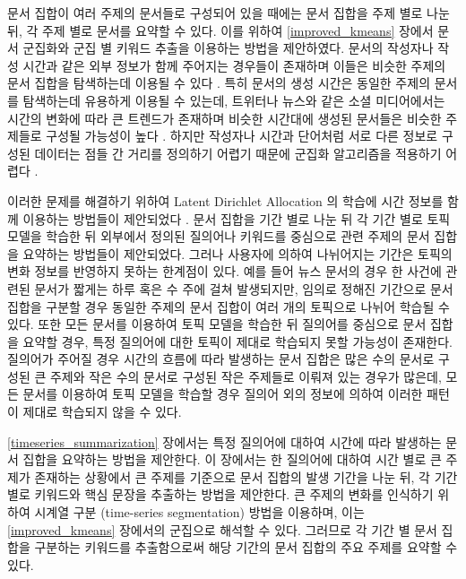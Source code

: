 \documentclass[oneside, ko,phd]{snuthesis_utf8_kor}
\begin{document}
문서 집합이 여러 주제의 문서들로 구성되어 있을 때에는 문서 집합을 주제 별로 나눈 뒤, 각 주제 별로 문서를 요약할 수 있다.
이를 위하여 \ref{improved_kmeans} 장에서 문서 군집화와 군집 별 키워드 추출을 이용하는 방법을 제안하였다.
문서의 작성자나 작성 시간과 같은 외부 정보가 함께 주어지는 경우들이 존재하며 이들은 비슷한 주제의 문서 집합을 탐색하는데 이용될 수 있다 \cite{liu2009topic, balasubramanyan2011block}.
특히 문서의 생성 시간은 동일한 주제의 문서를 탐색하는데 유용하게 이용될 수 있는데, 트위터나 뉴스와 같은 소셜 미디어에서는 시간의 변화에 따라 큰 트렌드가 존재하며 \cite{diao2012finding} 비슷한 시간대에 생성된 문서들은 비슷한 주제들로 구성될 가능성이 높다 \cite{blei2006dynamic, alsumait2008line}.
하지만 작성자나 시간과 단어처럼 서로 다른 정보로 구성된 데이터는 점들 간 거리를 정의하기 어렵기 때문에 군집화 알고리즘을 적용하기 어렵다 \cite{hennig2013find, browne2012model}.

이러한 문제를 해결하기 위하여 Latent Dirichlet Allocation \cite{blei2003latent} 의 학습에 시간 정보를 함께 이용하는 방법들이 제안되었다 \cite{blei2006dynamic, wang2006topics, huang2017probabilistic}.
문서 집합을 기간 별로 나눈 뒤 각 기간 별로 토픽 모델을 학습한 뒤 외부에서 정의된 질의어나 키워드를 중심으로 관련 주제의 문서 집합을 요약하는 방법들이 제안되었다.
그러나 사용자에 의하여 나뉘어지는 기간은 토픽의 변화 정보를 반영하지 못하는 한계점이 있다.
예를 들어 뉴스 문서의 경우 한 사건에 관련된 문서가 짧게는 하루 혹은 수 주에 걸쳐 발생되지만, 임의로 정해진 기간으로 문서 집합을 구분할 경우 동일한 주제의 문서 집합이 여러 개의 토픽으로 나뉘어 학습될 수 있다.
또한 모든 문서를 이용하여 토픽 모델을 학습한 뒤 질의어를 중심으로 문서 집합을 요약할 경우, 특정 질의어에 대한 토픽이 제대로 학습되지 못할 가능성이 존재한다.
질의어가 주어질 경우 시간의 흐름에 따라 발생하는 문서 집합은 많은 수의 문서로 구성된 큰 주제와 작은 수의 문서로 구성된 작은 주제들로 이뤄져 있는 경우가 많은데, 모든 문서를 이용하여 토픽 모델을 학습할 경우 질의어 외의 정보에 의하여 이러한 패턴이 제대로 학습되지 않을 수 있다.

\ref{timeseries_summarization} 장에서는 특정 질의어에 대하여 시간에 따라 발생하는 문서 집합을 요약하는 방법을 제안한다.
이 장에서는 한 질의어에 대하여 시간 별로 큰 주제가 존재하는 상황에서 큰 주제를 기준으로 문서 집합의 발생 기간을 나눈 뒤, 각 기간 별로 키워드와 핵심 문장을 추출하는 방법을 제안한다.
큰 주제의 변화를 인식하기 위하여 시계열 구분 (time-series segmentation) 방법을 이용하며, 이는 \ref{improved_kmeans} 장에서의 군집으로 해석할 수 있다.
그러므로 각 기간 별 문서 집합을 구분하는 키워드를 추출함으로써 해당 기간의 문서 집합의 주요 주제를 요약할 수 있다.
\end{document}
